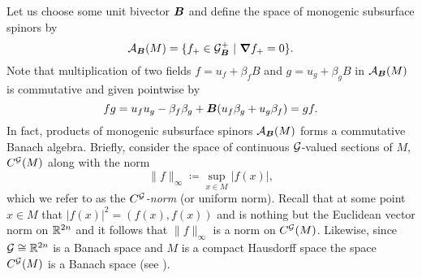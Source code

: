 Let us choose some unit bivector $\boldsymbol{B}$ and define the space of monogenic subsurface spinors by
\begin{equation}
\mathcal{A}_{\boldsymbol{B}}(M) = \{f_+ \in \mathcal{G}_{\boldsymbol{B}}^+ ~|~ \boldsymbol{\nabla} f_+ = 0\}.
\end{equation}
Note that multiplication of two fields $f=u_f+\beta_f B$ and $g=u_g+\beta_g B$ in $\mathcal{A}_{\boldsymbol{B}}(M)$ is commutative and given pointwise by
\begin{equation}
\label{eq:axial_multiplication}
fg = u_f u_g - \beta_f \beta_g + \boldsymbol{B} (u_f \beta_g + u_g \beta_f) = gf.
\end{equation}
In fact, products of monogenic subsurface spinors $\mathcal{A}_{\boldsymbol{B}}(M)$ forms a commutative Banach algebra. Briefly, consider the space of continuous $\mathcal{G}$-valued sections of $M$, $C^{\mathcal{G}}(M)$ along with the norm 
\begin{equation}
\|f\|_\infty \coloneqq \sup_{x\in M} |f(x)|,
\end{equation}
which we refer to as the \emph{$C^{\mathcal{G}}$-norm} (or uniform norm). Recall that at some point $x\in M$ that $|f(x)|^2=(f(x),f(x))$ and is nothing but the Euclidean vector norm on $\mathbb{R}^{2n}$ and it follows that $\|f\|_\infty$ is a norm on $C^{\mathcal{G}}(M)$. Likewise, since $\mathcal{G}\cong \mathbb{R}^{2n}$ is a Banach space and $M$ is a compact Hausdorff space the space $C^{\mathcal{G}}(M)$ is a Banach space (see ).
